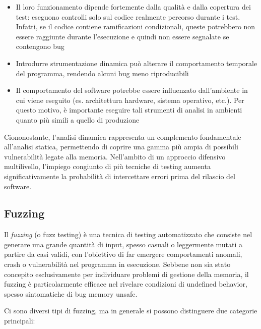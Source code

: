 \begin{itemize}
  \item Il loro funzionamento dipende fortemente dalla qualità e dalla copertura
    dei test: eseguono controlli solo sul codice realmente percorso durante i
    test. Infatti, se il codice contiene ramificazioni condizionali, queste potrebbero
    non essere raggiunte durante l'esecuzione e quindi non essere segnalate se contengono
    bug

  \item Introdurre strumentazione dinamica può alterare il comportamento temporale
    del programma, rendendo alcuni bug meno riproducibili

  \item Il comportamento del software potrebbe essere influenzato dall'ambiente in
    cui viene eseguito (es. architettura hardware, sistema operativo, etc.). Per
    questo motivo, è importante eseguire tali strumenti di analisi in ambienti quanto
    più simili a quello di produzione
\end{itemize}

Ciononostante, l'analisi dinamica rappresenta un complemento fondamentale all'analisi
statica, permettendo di coprire una gamma più ampia di possibili vulnerabilità
legate alla memoria. Nell'ambito di un approccio difensivo multilivello, l'impiego
congiunto di più tecniche di testing aumenta significativamente la probabilità
di intercettare errori prima del rilascio del software.

\subsection{Fuzzing}
\label{sec:fuzzing}

Il \textit{fuzzing} (o fuzz testing) è una tecnica di testing automatizzato che
consiste nel generare una grande quantità di input, spesso casuali o leggermente
mutati a partire da casi validi, con l'obiettivo di far emergere comportamenti
anomali, crash o vulnerabilità nel programma in esecuzione. Sebbene non sia
stato concepito esclusivamente per individuare problemi di gestione della
memoria, il fuzzing è particolarmente efficace nel rivelare condizioni di undefined
behavior, spesso sintomatiche di bug memory unsafe.

\smallskip
Ci sono diversi tipi di fuzzing, ma in generale si possono distinguere due categorie
principali:

